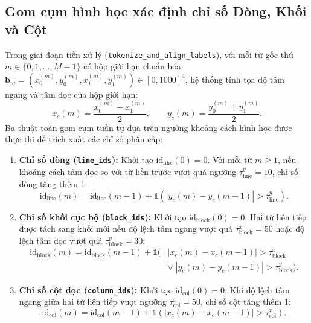 \subsection{Gom cụm hình học xác định chỉ số Dòng, Khối và Cột}
Trong giai đoạn tiền xử lý (\texttt{tokenize\_and\_}\allowbreak\texttt{align\_labels}), với mỗi từ gốc thứ $m \in \{0, 1, \dots, M-1\}$ có hộp giới hạn chuẩn hóa $\mathbf{b}_m = (x_0^{(m)}, y_0^{(m)}, x_1^{(m)}, y_1^{(m)}) \in [0, 1000]^4$, hệ thống tính tọa độ tâm ngang và tâm dọc của hộp giới hạn:
\begin{equation}
    x_c(m) = \frac{x_0^{(m)} + x_1^{(m)}}{2}, \qquad y_c(m) = \frac{y_0^{(m)} + y_1^{(m)}}{2}.
\end{equation}
Ba thuật toán gom cụm tuần tự dựa trên ngưỡng khoảng cách hình học được thực thi để trích xuất các chỉ số phân cấp:
\begin{enumerate}
    \item \textbf{Chỉ số dòng (\texttt{line\_ids}):} Khởi tạo $\text{id}_{\text{line}}(0) = 0$. Với mỗi từ $m \ge 1$, nếu khoảng cách tâm dọc so với từ liền trước vượt quá ngưỡng $\tau_{\text{line}}^y = 10$, chỉ số dòng tăng thêm 1:
    \begin{equation}
        \text{id}_{\text{line}}(m) = \text{id}_{\text{line}}(m-1) + \mathds{1}\!\left( \left| y_c(m) - y_c(m-1) \right| > \tau_{\text{line}}^y \right).
    \end{equation}
    \item \textbf{Chỉ số khối cục bộ (\texttt{block\_ids}):} Khởi tạo $\text{id}_{\text{block}}(0) = 0$. Hai từ liên tiếp được tách sang khối mới nếu độ lệch tâm ngang vượt quá $\tau_{\text{block}}^x = 50$ hoặc độ lệch tâm dọc vượt quá $\tau_{\text{block}}^y = 30$:
    \begin{equation}
    \begin{split}
        \text{id}_{\text{block}}(m) = \text{id}_{\text{block}}(m-1) + \mathds{1}\Big( &\left| x_c(m) - x_c(m-1) \right| > \tau_{\text{block}}^x \\
        &\lor\; \left| y_c(m) - y_c(m-1) \right| > \tau_{\text{block}}^y \Big).
    \end{split}
    \end{equation}
    \item \textbf{Chỉ số cột dọc (\texttt{column\_ids}):} Khởi tạo $\text{id}_{\text{col}}(0) = 0$. Khi độ lệch tâm ngang giữa hai từ liên tiếp vượt ngưỡng $\tau_{\text{col}}^x = 50$, chỉ số cột tăng thêm 1:
    \begin{equation}
        \text{id}_{\text{col}}(m) = \text{id}_{\text{col}}(m-1) + \mathds{1}\!\left( \left| x_c(m) - x_c(m-1) \right| > \tau_{\text{col}}^x \right).
    \end{equation}
\end{enumerate}

